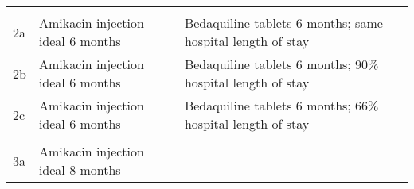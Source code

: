 \documentclass[]{article}
\begin{document}
\begin{longtable}[]{@{}lll@{}}
\begin{minipage}[t]{0.41\columnwidth}
\strut
\end{minipage}\tabularnewline
\begin{minipage}[t]{0.08\columnwidth}\raggedright
2a\strut
\end{minipage} & \begin{minipage}[t]{0.41\columnwidth}\raggedright
Amikacin injection ideal 6 months\strut
\end{minipage} & \begin{minipage}[t]{0.41\columnwidth}\raggedright
Bedaquiline tablets 6 months; same hospital length of stay\strut
\end{minipage}\tabularnewline
\begin{minipage}[t]{0.08\columnwidth}\raggedright
2b\strut
\end{minipage} & \begin{minipage}[t]{0.41\columnwidth}\raggedright
Amikacin injection ideal 6 months\strut
\end{minipage} & \begin{minipage}[t]{0.41\columnwidth}\raggedright
Bedaquiline tablets 6 months; 90\% hospital length of stay\strut
\end{minipage}\tabularnewline
\begin{minipage}[t]{0.08\columnwidth}\raggedright
2c\strut
\end{minipage} & \begin{minipage}[t]{0.41\columnwidth}\raggedright
Amikacin injection ideal 6 months\strut
\end{minipage} & \begin{minipage}[t]{0.41\columnwidth}\raggedright
Bedaquiline tablets 6 months; 66\% hospital length of stay\strut
\end{minipage}\tabularnewline
\begin{minipage}[t]{0.08\columnwidth}\raggedright
\strut
\end{minipage} & \begin{minipage}[t]{0.41\columnwidth}\raggedright
\strut
\end{minipage} & \begin{minipage}[t]{0.41\columnwidth}\raggedright
\strut
\end{minipage}\tabularnewline
\begin{minipage}[t]{0.08\columnwidth}\raggedright
3a\strut
\end{minipage} & \begin{minipage}[t]{0.41\columnwidth}\raggedright
Amikacin injection ideal 8 months\strut
\end{minipage} & \begin{minipage}[t]{0.41\columnwidth}\raggedright

\end{minipage}
\end{longtable}
\end{document}
